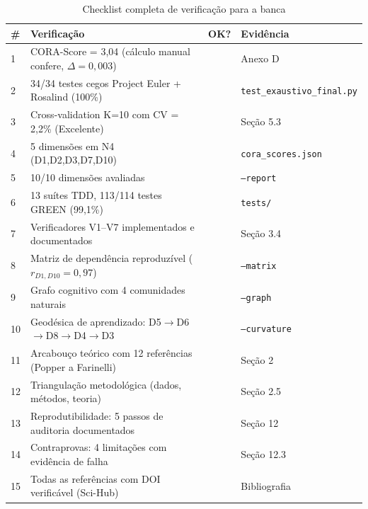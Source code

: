 \begin{table}[H]\centering\footnotesize
\caption{Checklist completa de verificação para a banca}
\label{tab:checklist_full}
\begin{tabular}{p{}p{}p{}p{}}
\toprule
\textbf{\#} & \textbf{Verificação} & \textbf{OK?} & \textbf{Evidência} \\
\midrule
1 & CORA-Score = 3,04 (cálculo manual confere, $\Delta = 0,003$) & & Anexo D \\
2 & 34/34 testes cegos Project Euler + Rosalind (100\%) & & \texttt{test\_exaustivo\_final.py} \\
3 & Cross-validation K=10 com CV = 2,2\% (Excelente) & & Seção 5.3 \\
4 & 5 dimensões em N4 (D1,D2,D3,D7,D10) & & \texttt{cora\_scores.json} \\
5 & 10/10 dimensões avaliadas & & \texttt{--report} \\
6 & 13 suítes TDD, 113/114 testes GREEN (99,1\%) & & \texttt{tests/} \\
7 & Verificadores V1--V7 implementados e documentados & & Seção 3.4 \\
8 & Matriz de dependência reproduzível ($r_{D1,D10} = 0,97$) & & \texttt{--matrix} \\
9 & Grafo cognitivo com 4 comunidades naturais & & \texttt{--graph} \\
10 & Geodésica de aprendizado: D5$\to$D6$\to$D8$\to$D4$\to$D3 & & \texttt{--curvature} \\
11 & Arcabouço teórico com 12 referências (Popper a Farinelli) & & Seção 2 \\
12 & Triangulação metodológica (dados, métodos, teoria) & & Seção 2.5 \\
13 & Reprodutibilidade: 5 passos de auditoria documentados & & Seção 12 \\
14 & Contraprovas: 4 limitações com evidência de falha & & Seção 12.3 \\
15 & Todas as referências com DOI verificável (Sci-Hub) & & Bibliografia \\
\bottomrule
\end{tabular}
\end{table}
